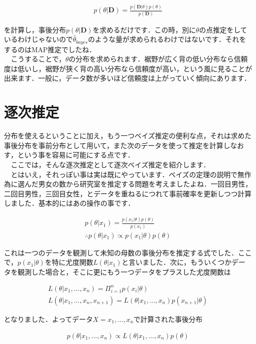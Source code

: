 \documentclass[11pt,a4paper,uplatex]{ujreport} 	%
\begin{document}
\begin{align}
p(\theta|\mathbf{D}) = \frac{p(\mathbf{D}|\theta) p(\theta)}{p(\mathbf{D})}
\end{align}

を計算し，事後分布$p(\theta|\mathbf{D})$を求めるだけです．この時，別に$\theta$の点推定をしているわけじゃないので$\hat \theta_{bayes}$のような量が求められるわけではないです．それをするのはMAP推定でしたね．\\
　こうすることで，$\theta$の分布を求められます．裾野が広く背の低い分布なら信頼度は低いし，裾野が狭く背の高い分布なら信頼度が高い，という風に見ることが出来ます．一般に，データ数が多いほど信頼度は上がっていく傾向にあります．

\section{逐次推定}
分布を使えるということに加え，もう一つベイズ推定の便利な点，それは求めた事後分布を事前分布として用いて，また次のデータを使って推定を計算しなおす，という事を容易に可能にする点です．\\
　ここでは，そんな逐次推定として逐次ベイズ推定を紹介します．\\
　とはいえ，それっぽい事は実は既にやっています．ベイズの定理の説明で無作為に選んだ男女の数から研究室を推定する問題を考えましたよね．一回目男性，二回目男性，三回目女性，とデータを重ねるにつれて事前確率を更新しつつ計算しました．基本的にはあの操作の事です．

\begin{align}
p(\theta|x_1) = \frac{p(x_1|\theta)p(\theta)}{p(x_1)} \nonumber \\
\therefore p(\theta|x_1) \propto p(x_1|\theta)p(\theta)
\end{align}

これは一つのデータを観測して未知の母数の事後分布を推定する式でした．ここで，$p(x_1|\theta)$を特に尤度関数$L(\theta|x_1)$と言いました．次に，もういくつかデータを観測した場合と，そこに更にもう一つデータをプラスした尤度関数は

\begin{align}
L(\theta|x_1,... ,x_n) = \Pi_{i=1}^{n} p(x_i | \theta)\\
L(\theta|x_1,... ,x_n, x_{n+1}) = L(\theta|x_1,... ,x_n) p(x_{n+1} |\theta)
\end{align}

となりました．よってデータ$X=x_1,...,x_n$で計算された事後分布


\begin{align}
p(\theta|x_1, ..., x_{n}) \propto L(\theta|x_1, ..., x_{n})p(\theta)\\
\end{align}
\end{document}
